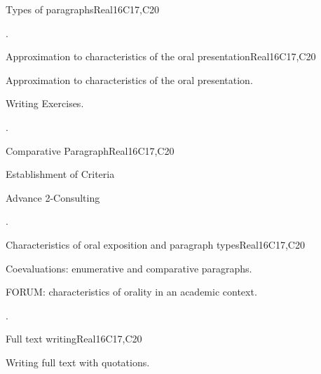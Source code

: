 \begin{syllabus}
\begin{unit}{Types of paragraphs}{}{Real}{16}{C17,C20}
  \begin{learningoutcomes}
   \item .%
  \end{learningoutcomes}
\end{unit}

\begin{unit}{Approximation to characteristics of the oral presentation}{}{Real}{16}{C17,C20}
  \begin{topics}
      \item Approximation to characteristics of the oral presentation.
      \item Writing Exercises.
  \end{topics}

  \begin{learningoutcomes}
   \item .%
  \end{learningoutcomes}
\end{unit}

\begin{unit}{Comparative Paragraph}{}{Real}{16}{C17,C20}
  \begin{topics}
      \item Establishment of Criteria
      \item Advance 2-Consulting
  \end{topics}

  \begin{learningoutcomes}
   \item .%
  \end{learningoutcomes}
\end{unit}

\begin{unit}{Characteristics of oral exposition and paragraph types}{}{Real}{16}{C17,C20}
  \begin{topics}
      \item Coevaluations: enumerative and comparative paragraphs.
      \item FORUM: characteristics of orality in an academic context.
  \end{topics}

  \begin{learningoutcomes}
   \item .%
  \end{learningoutcomes}
\end{unit}

\begin{unit}{Full text writing}{}{Real}{16}{C17,C20}
  \begin{topics}
      \item Writing full text with quotations.
  \end{topics}


\end{unit}
\end{syllabus}
